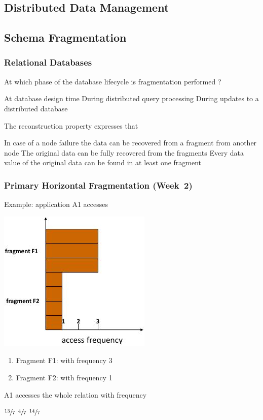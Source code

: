 \documentclass[12pt,a4paper,answers]{exam} %
\begin{document}
\begin{flushleft}
\begin{multicols*}{2}
\begin{questions}
\section{Distributed Data Management}

\subsection{Schema Fragmentation}
\subsubsection{Relational Databases}

\question At which phase of the database lifecycle is fragmentation performed ?
\begin{checkboxes}
\CorrectChoice At database design time
\choice During distributed query processing
\choice During updates to a distributed database
\end{checkboxes}

\question The reconstruction property expresses that
\begin{checkboxes}
\choice In case of a node failure the data can be recovered from a fragment from another node
\CorrectChoice The original data can be fully recovered from the fragments
\choice Every data value of the original data can be found in at least one fragment
\end{checkboxes}



\subsubsection{Primary Horizontal Fragmentation (Week~2)} %

\question Example: application A1 accesses
\begin{colfig}
\includegraphics[scale=0.5]{w2_s16}
\end{colfig}
\begin{enumerate}
\item Fragment F1: with frequency 3
\item Fragment F2: with frequency 1
\end{enumerate}
A1 accesses the whole relation with frequency
\begin{checkboxes}
\CorrectChoice $\sfrac{13}{7}$
\choice $\sfrac{4}{7}$
\choice $\sfrac{14}{7}$
\end{checkboxes}


\end{questions}
\end{multicols*}
\end{flushleft}
\end{document}
